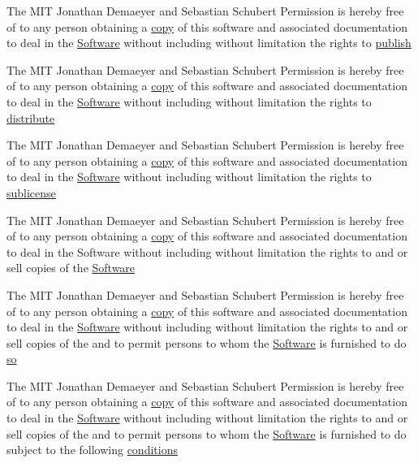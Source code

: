 \begin{DoxyCompactItemize}
\item 
The M\+IT Jonathan Demaeyer and Sebastian Schubert Permission is hereby free of to any person obtaining a \hyperlink{LICENSE_8txt_a51c339ce34cc545067d7d7c01c627159}{copy} of this software and associated documentation to deal in the \hyperlink{LICENSE_8txt_a5972617605af8d0ee35a18608e832e08}{Software} without including without limitation the rights to \hyperlink{LICENSE_8txt_afb7821403b8db816807ae41851a6e338}{publish}
\item 
The M\+IT Jonathan Demaeyer and Sebastian Schubert Permission is hereby free of to any person obtaining a \hyperlink{LICENSE_8txt_a51c339ce34cc545067d7d7c01c627159}{copy} of this software and associated documentation to deal in the \hyperlink{LICENSE_8txt_a5972617605af8d0ee35a18608e832e08}{Software} without including without limitation the rights to \hyperlink{LICENSE_8txt_affbfb11626af26170017dc3174749a7b}{distribute}
\item 
The M\+IT Jonathan Demaeyer and Sebastian Schubert Permission is hereby free of to any person obtaining a \hyperlink{LICENSE_8txt_a51c339ce34cc545067d7d7c01c627159}{copy} of this software and associated documentation to deal in the \hyperlink{LICENSE_8txt_a5972617605af8d0ee35a18608e832e08}{Software} without including without limitation the rights to \hyperlink{LICENSE_8txt_a2d02ad98d8bbfd91a923533c6d2e3bec}{sublicense}
\item 
The M\+IT Jonathan Demaeyer and Sebastian Schubert Permission is hereby free of to any person obtaining a \hyperlink{LICENSE_8txt_a51c339ce34cc545067d7d7c01c627159}{copy} of this software and associated documentation to deal in the Software without including without limitation the rights to and or sell copies of the \hyperlink{LICENSE_8txt_a5972617605af8d0ee35a18608e832e08}{Software}
\item 
The M\+IT Jonathan Demaeyer and Sebastian Schubert Permission is hereby free of to any person obtaining a \hyperlink{LICENSE_8txt_a51c339ce34cc545067d7d7c01c627159}{copy} of this software and associated documentation to deal in the \hyperlink{LICENSE_8txt_a5972617605af8d0ee35a18608e832e08}{Software} without including without limitation the rights to and or sell copies of the and to permit persons to whom the \hyperlink{LICENSE_8txt_a5972617605af8d0ee35a18608e832e08}{Software} is furnished to do \hyperlink{LICENSE_8txt_a24a909263a383e389f43dbaea954a90b}{so}
\item 
The M\+IT Jonathan Demaeyer and Sebastian Schubert Permission is hereby free of to any person obtaining a \hyperlink{LICENSE_8txt_a51c339ce34cc545067d7d7c01c627159}{copy} of this software and associated documentation to deal in the \hyperlink{LICENSE_8txt_a5972617605af8d0ee35a18608e832e08}{Software} without including without limitation the rights to and or sell copies of the and to permit persons to whom the \hyperlink{LICENSE_8txt_a5972617605af8d0ee35a18608e832e08}{Software} is furnished to do subject to the following \hyperlink{LICENSE_8txt_a49ab5f359597b06e0efbb15cdb0b68e0}{conditions}

\end{DoxyCompactItemize}
